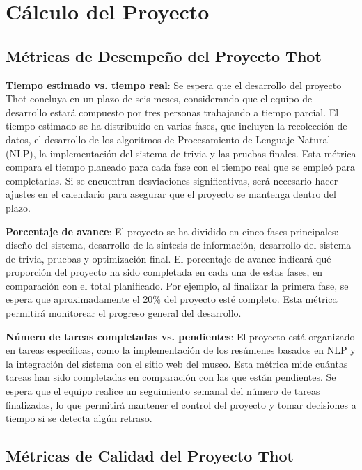 \documentclass{report}
\begin{document}
    \section{Cálculo del Proyecto}
    \subsection{Métricas de Desempeño del Proyecto Thot}

    \justify
    \textbf{Tiempo estimado vs. tiempo real}: Se espera que el desarrollo del proyecto Thot concluya en un plazo de seis meses, considerando que el equipo de desarrollo estará compuesto por tres personas trabajando a tiempo parcial. El tiempo estimado se ha distribuido en varias fases, que incluyen la recolección de datos, el desarrollo de los algoritmos de Procesamiento de Lenguaje Natural (NLP), la implementación del sistema de trivia y las pruebas finales. Esta métrica compara el tiempo planeado para cada fase con el tiempo real que se empleó para completarlas. Si se encuentran desviaciones significativas, será necesario hacer ajustes en el calendario para asegurar que el proyecto se mantenga dentro del plazo.

    \justify
    \textbf{Porcentaje de avance}: El proyecto se ha dividido en cinco fases principales: diseño del sistema, desarrollo de la síntesis de información, desarrollo del sistema de trivia, pruebas y optimización final. El porcentaje de avance indicará qué proporción del proyecto ha sido completada en cada una de estas fases, en comparación con el total planificado. Por ejemplo, al finalizar la primera fase, se espera que aproximadamente el 20\% del proyecto esté completo. Esta métrica permitirá monitorear el progreso general del desarrollo.

    \justify
    \textbf{Número de tareas completadas vs. pendientes}: El proyecto está organizado en tareas específicas, como la implementación de los resúmenes basados en NLP y la integración del sistema con el sitio web del museo. Esta métrica mide cuántas tareas han sido completadas en comparación con las que están pendientes. Se espera que el equipo realice un seguimiento semanal del número de tareas finalizadas, lo que permitirá mantener el control del proyecto y tomar decisiones a tiempo si se detecta algún retraso.

    \subsection{Métricas de Calidad del Proyecto Thot}
\end{document}
